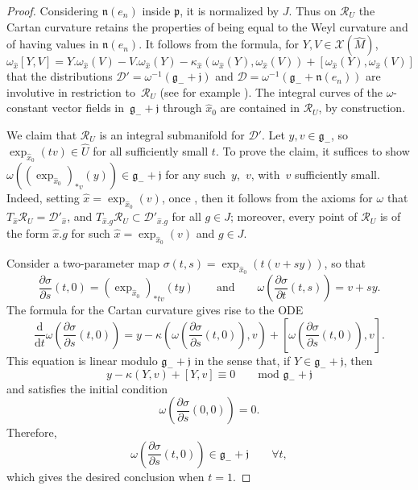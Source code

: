 \documentclass[pdftex]{sigma}
\numberwithin{equation}{section}
\theoremstyle{definition}
\def\g{{\mathfrak g}}
\def\p{{\mathfrak p}}
\def\n{{\mathfrak n}}
\begin{document}
\begin{proof}
Considering $\n(e_n)$ inside $\p$, it is normalized by $J$. Thus on $\mathcal{R}_U$ the Cartan curvature retains the properties of being equal to the Weyl curvature and of having values in $\n(e_n)$. It follows from the formula, for $Y,V \in \mathcal{X}(\hat{M})$,
\[\omega_{\hat{x}}[Y,V] = Y.\omega_{\hat{x}}(V) - V. \omega_{\hat{x}}(Y) - \kappa_{\hat{x}}(\omega_{\hat{x}}(Y),\omega_{\hat{x}}(V)) + [ \omega_{\hat{x}}(Y),\omega_{\hat{x}}(V)] \]
that the distributions $\mathcal{D}' = \omega^{-1}(\g_- + \mathfrak{j})$ and $\mathcal{D} = \omega^{-1}(\g_- + \n(e_n))$ are involutive in restriction to~$\mathcal{R}_U$ (see for example \cite[Section~4]{mp.confdambra}). The integral curves of the $\omega$-constant vector fields in~${\g_- + \mathfrak{j}}$ through $\hat{x}_0$ are contained in $\mathcal{R}_U$, by construction.

We claim that $\mathcal{R}_U$ is an integral submanifold for $\mathcal{D}'$. Let $y, v \in \g_-$, so $\exp_{\hat{x}_0} (tv) \in \hat{U}$ for all sufficiently small $t$. To prove the claim, it suffices to show $\omega((\exp_{\hat{x}_0})_{*v} (y)) \in \g_- + \mathfrak{j}$ for any such~$y$,~$v$, with~$v$ sufficiently small. Indeed, setting $\hat{x} = \exp_{\hat{x}_0} (v)$, once , then it follows from the axioms for $\omega$ that $T_{\hat{x}} \mathcal{R}_U = \mathcal{D}'_{\hat{x}}$, and $T_{\hat{x}.g} \mathcal{R}_U \subset \mathcal{D}'_{\hat{x}.g}$ for all $g \in J$; moreover, every point of $\mathcal{R}_U$ is of the form $\hat{x}.g$ for such $\hat{x} = \exp_{\hat{x}_0}(v)$ and $g \in J$.

Consider a two-parameter map $\sigma(t,s) = \exp_{\hat{x}_0} (t(v+sy))$, so that
\[ \frac{\partial \sigma}{\partial s} (t,0) = (\exp_{\hat{x}_0})_{*tv}(ty) \qquad \mbox{and} \qquad \omega \left( \frac{\partial \sigma}{\partial t} (t,s) \right) = v + sy.\]
The formula for the Cartan curvature gives rise to the ODE
\[ \frac{\mathrm{d}}{\mathrm{d}t} \omega \left( \frac{\partial \sigma}{\partial s}(t,0) \right) = y - \kappa \left( \omega \left( \frac{\partial \sigma}{\partial s} (t,0) \right), v \right) + \left[ \omega \left( \frac{\partial \sigma}{\partial s}(t,0)\right), v \right].\]
This equation is linear modulo $\g_- + \mathfrak{j}$ in the sense that, if $Y \in \g_- + \mathfrak{j}$, then
\[ y - \kappa (Y, v ) + [Y,v] \equiv 0 \qquad \mbox{mod } \g_- + \mathfrak{j}\]
and satisfies the initial condition
\[\omega \left( \frac{\partial \sigma}{\partial s}(0,0) \right) = 0.\]
Therefore,
\[\omega \left( \frac{\partial \sigma}{\partial s}(t,0) \right) \in \g_- + \mathfrak{j} \qquad \forall t,\]
which gives the desired conclusion when $t=1$.


\end{proof}
\end{document}
